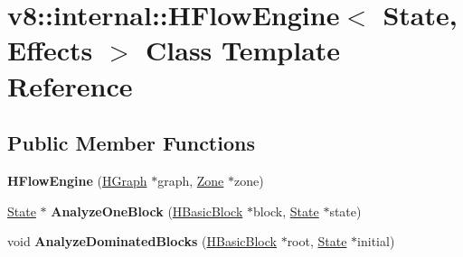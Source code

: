 \hypertarget{classv8_1_1internal_1_1_h_flow_engine}{}\section{v8\+:\+:internal\+:\+:H\+Flow\+Engine$<$ State, Effects $>$ Class Template Reference}
\label{classv8_1_1internal_1_1_h_flow_engine}
\subsection*{Public Member Functions}
\begin{DoxyCompactItemize}
\item 
{\bfseries H\+Flow\+Engine} (\hyperlink{classv8_1_1internal_1_1_h_graph}{H\+Graph} $\ast$graph, \hyperlink{classv8_1_1internal_1_1_zone}{Zone} $\ast$zone)\hypertarget{classv8_1_1internal_1_1_h_flow_engine_a6bc48f0a65c7b2bb720e2853ac0e88c0}{}\label{classv8_1_1internal_1_1_h_flow_engine_a6bc48f0a65c7b2bb720e2853ac0e88c0}

\item 
\hyperlink{classv8_1_1internal_1_1_state}{State} $\ast$ {\bfseries Analyze\+One\+Block} (\hyperlink{classv8_1_1internal_1_1_h_basic_block}{H\+Basic\+Block} $\ast$block, \hyperlink{classv8_1_1internal_1_1_state}{State} $\ast$state)\hypertarget{classv8_1_1internal_1_1_h_flow_engine_a3118e6c3d5976252af3d83378ef2d6ef}{}\label{classv8_1_1internal_1_1_h_flow_engine_a3118e6c3d5976252af3d83378ef2d6ef}

\item 
void {\bfseries Analyze\+Dominated\+Blocks} (\hyperlink{classv8_1_1internal_1_1_h_basic_block}{H\+Basic\+Block} $\ast$root, \hyperlink{classv8_1_1internal_1_1_state}{State} $\ast$initial)\hypertarget{classv8_1_1internal_1_1_h_flow_engine_a7edf559db3455737a9dcfbe17a288706}{}\label{classv8_1_1internal_1_1_h_flow_engine_a7edf559db3455737a9dcfbe17a288706}

\end{DoxyCompactItemize}
